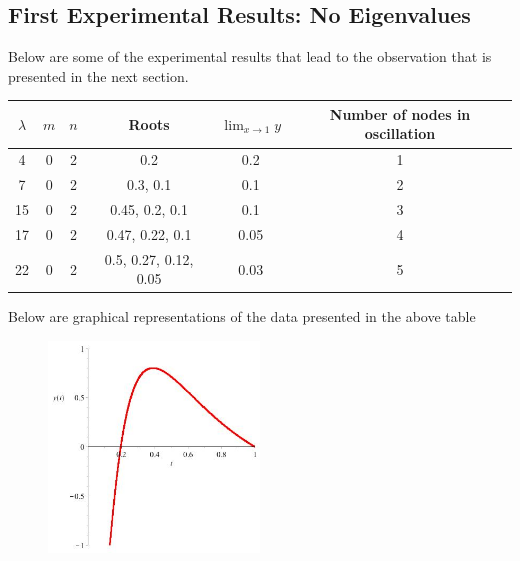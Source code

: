 \documentclass[executivepaper]{article}
\begin{document}
\subsection*{First Experimental Results: No Eigenvalues}

Below are some of the experimental results that lead to the observation that is presented in the next section.

\begin{center}

\begin{tabular}{||c c c c c c||}

\hline

$\lambda$ & $m$ & $n$ & Roots & $\lim_{x \to 1} y$ & Number of nodes in oscillation \\ [0.5ex]

\hline\hline

4 & 0 & 2 & 0.2 & 0.2 & 1  \\ 

\hline

7 & 0 & 2 & 0.3, 0.1 & 0.1 & 2  \\

\hline

15 & 0 & 2 & 0.45, 0.2, 0.1 & 0.1 & 3  \\

\hline

17 & 0 & 2 & 0.47, 0.22, 0.1 & 0.05 & 4  \\
\hline

22 & 0 & 2 & 0.5, 0.27, 0.12, 0.05 & 0.03 & 5 \\ [1ex]

\hline

\end{tabular}

\vspace{5mm}

Below are graphical representations of the data presented in the above table

\begin{figure}[H]

\centering

\includegraphics[width=0.5\textwidth]{NEquals2MEquals0LambdaEquals4}


\end{figure}
\end{center}
\end{document}
